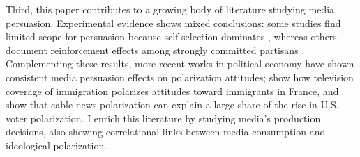 \documentclass[12pt]{article}
\begin{document}
Third, this paper contributes to a growing body of literature studying media persuasion. Experimental evidence shows mixed conclusions: some studies find limited scope for persuasion because self-selection dominates \citep{arceneaux_johnson_2013}, whereas others document reinforcement effects among strongly committed partisans \citep{levendusky}. Complementing these results, more recent works in political economy  have shown consistent media persuasion effects on polarization attitudes; \citet{schneider2025media} show how television coverage of immigration polarizes attitudes toward immigrants in France, and \citet{martin2017} show that cable-news polarization can explain a large share of the rise in U.S. voter polarization. I enrich this literature by studying media's production decisions, also showing correlational links between media consumption and ideological polarization.










\end{document}
